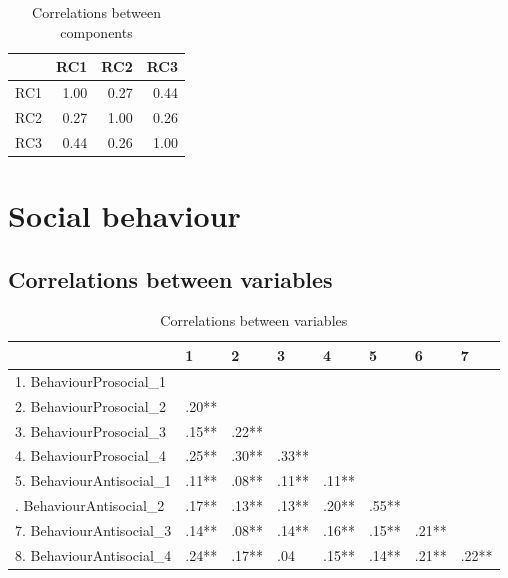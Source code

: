 \documentclass[]{article}
\begin{document}
\begin{table}[H]

\caption{\label{tab:unnamed-chunk-61}Correlations between components}
\centering
\fontsize{6}{8}\selectfont
\begin{tabular}[t]{lrrr}
\toprule
  & RC1 & RC2 & RC3\\
\midrule
RC1 & 1.00 & 0.27 & 0.44\\
RC2 & 0.27 & 1.00 & 0.26\\
RC3 & 0.44 & 0.26 & 1.00\\
\bottomrule
\end{tabular}
\end{table}

\newpage

\hypertarget{social-behaviour}{%
\section{Social behaviour}\label{social-behaviour}}

\hypertarget{correlations-between-variables-12}{%
\subsection{Correlations between
variables}\label{correlations-between-variables-12}}

\begin{table}[H]

\caption{\label{tab:unnamed-chunk-62}Correlations between variables}
\centering
\fontsize{6}{8}\selectfont
\begin{tabular}[t]{llllllll}
\toprule
  & 1 & 2 & 3 & 4 & 5 & 6 & 7\\
\midrule
1. BehaviourProsocial\_1 &  &  &  &  &  &  & \\
2. BehaviourProsocial\_2 & .20** &  &  &  &  &  & \\
3. BehaviourProsocial\_3 & .15** & .22** &  &  &  &  & \\
4. BehaviourProsocial\_4 & .25** & .30** & .33** &  &  &  & \\
5. BehaviourAntisocial\_1 & .11** & .08** & .11** & .11** &  &  & \\
\addlinespace
6. BehaviourAntisocial\_2 & .17** & .13** & .13** & .20** & .55** &  & \\
7. BehaviourAntisocial\_3 & .14** & .08** & .14** & .16** & .15** & .21** & \\
8. BehaviourAntisocial\_4 & .24** & .17** & .04 & .15** & .14** & .21** & .22**\\
\bottomrule
\end{tabular}
\end{table}
\end{document}
